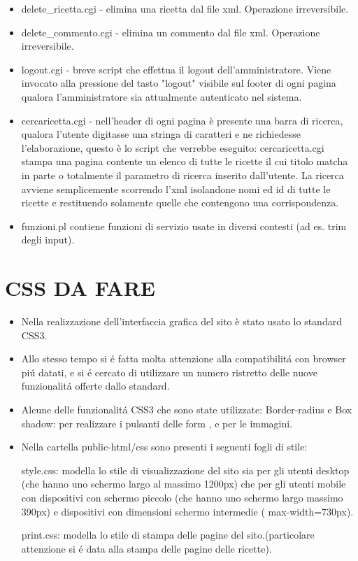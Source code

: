 \documentclass[12pt]{article}
\begin{document}
\begin{itemize}
				\item delete\_ricetta.cgi - elimina una ricetta dal file xml. Operazione irreversibile.

				\item delete\_commento.cgi - elimina un commento dal file xml. Operazione irreversibile.

				\item logout.cgi - breve script che effettua il logout dell'amministratore. Viene invocato alla pressione del tasto "logout" visibile sul footer di ogni pagina qualora l'amministratore sia attualmente autenticato nel sistema.

				\item cercaricetta.cgi - nell'header di ogni pagina è presente una barra di ricerca, qualora l'utente digitasse una stringa di caratteri e ne richiedesse l'elaborazione, questo \`e lo script che verrebbe eseguito: cercaricetta.cgi stampa una pagina contente un elenco di tutte le ricette il cui titolo matcha in parte o totalmente il parametro di ricerca inserito dall'utente. La ricerca avviene semplicemente scorrendo l'xml isolandone nomi ed id di tutte le ricette e restituendo solamente quelle che contengono una corrispondenza.

				\item funzioni.pl  contiene funzioni di servizio usate in diversi contesti (ad es. trim degli input).	

\end{itemize}	
			
		\newpage	
	\section{CSS DA FARE}
			\begin{itemize}
				\item Nella realizzazione dell'interfaccia grafica del sito è stato usato lo standard CSS3.
				\item Allo stesso tempo si \'e fatta molta attenzione alla compatibilit\'a con browser pi\'u datati, e si \'e cercato di utilizzare un numero ristretto delle nuove funzionalit\'a offerte dallo standard.
				
				\item Alcune delle funzionalit\'a CSS3 che sono state utilizzate:
				Border-radius e Box shadow: per realizzare i pulsanti delle form , e per le immagini.
				
			
				\item Nella cartella public-html/css sono presenti i seguenti fogli di stile:

				\subitem style.css: modella lo stile di visualizzazione del sito sia per gli utenti desktop (che hanno uno schermo largo al massimo 1200px) che per gli utenti mobile con dispositivi con schermo piccolo (che hanno uno schermo largo massimo 390px) e dispositivi con dimensioni schermo intermedie ( max-width=730px).


				\subitem print.css: modella lo stile di stampa delle pagine del sito.(particolare attenzione si \'e data alla stampa delle pagine delle ricette).

\end{itemize}
					\newpage
				
\end{document}
